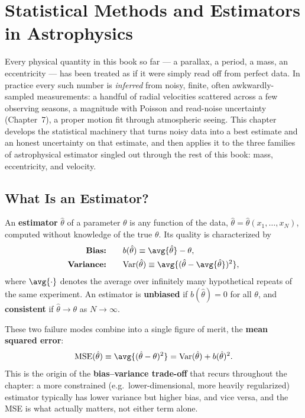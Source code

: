 \chapter{Statistical Methods and Estimators in Astrophysics}

Every physical quantity in this book so far --- a parallax, a period, a mass, an eccentricity --- has been treated as if it were simply read off from perfect data. In practice every such number is \emph{inferred} from noisy, finite, often awkwardly-sampled measurements: a handful of radial velocities scattered across a few observing seasons, a magnitude with Poisson and read-noise uncertainty (Chapter~7), a proper motion fit through atmospheric seeing. This chapter develops the statistical machinery that turns noisy data into a best estimate and an honest uncertainty on that estimate, and then applies it to the three families of astrophysical estimator singled out through the rest of this book: mass, eccentricity, and velocity.

\section{What Is an Estimator?}

\begin{definition}
	An \textbf{estimator} $\hat\theta$ of a parameter $\theta$ is any function of the data, $\hat\theta=\hat\theta(x_1,\dots,x_N)$, computed without knowledge of the true $\theta$. Its quality is characterized by
	\begin{align}
		\textbf{Bias:} \qquad & b(\hat\theta) \equiv \avg{\hat\theta}-\theta, \\
		\textbf{Variance:} \qquad & \mathrm{Var}(\hat\theta) \equiv \avg{(\hat\theta-\avg{\hat\theta})^2},
	\end{align}
	where $\avg{\cdot}$ denotes the average over infinitely many hypothetical repeats of the same experiment. An estimator is \textbf{unbiased} if $b(\hat\theta)=0$ for all $\theta$, and \textbf{consistent} if $\hat\theta\to\theta$ as $N\to\infty$.
\end{definition}

These two failure modes combine into a single figure of merit, the \textbf{mean squared error}:
\begin{equation}
	\mathrm{MSE}(\hat\theta) \equiv \avg{(\hat\theta-\theta)^2} = \mathrm{Var}(\hat\theta) + b(\hat\theta)^2.
	\label{eq:mse_decomposition}
\end{equation}
This is the origin of the \textbf{bias--variance trade-off} that recurs throughout the chapter: a more constrained (e.g.\ lower-dimensional, more heavily regularized) estimator typically has lower variance but higher bias, and vice versa, and the MSE is what actually matters, not either term alone.

